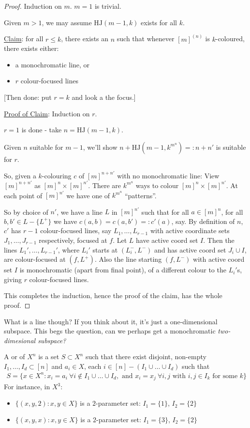 \documentclass[10pt]{article}
\newcommand{\hj}{\textrm{HJ}}
\begin{document}
\begin{proof}
   Induction on $m$. $m = 1$ is trivial.

   Given $m > 1$, we may assume $\hj(m-1,k)$ exists for all $k$.

   \underline{Claim}: for all $r\le k$, there exists an $n$ such that whenever $[m]^{(n)}$ is $k$-coloured, there exists either:
   \begin{itemize}
       \item a monochromatic line, or
       \item $r$ colour-focused lines
   \end{itemize}
   [Then done: put $r = k$ and look a the focus.]

   \underline{Proof of Claim}: Induction on $r$.

   $r = 1$ is done - take $n = \hj(m-1,k)$.

   Given $n$ suitable for $m-1$, we'll show $n + \hj(m-1,k^{m^n}) = : n + n'$ is suitable for $r$.

   So, given a $k$-colouring $c$ of $[m]^{n+n'}$ with no monochromatic line: View $[m]^{n+n'}$ as $[m]^{n}\times [m]^{n'}$. There are $k^{m^n}$ ways to colour $[m]^{n}\times [m]^{n'}$. At each point of $[m]^{n'}$ we have one of $k^{m^n}$ ``patterns''.

   So by choice of $n'$, we have a line $L$ in $[m]^{n'}$ such that for all $a \in [m]^{n}$, for all $b,b' \in L - \{L^+\}$ we have $c(a,b) = c(a,b') =: c'(a)$, say. By definition of $n$, $c'$ has $r-1$ colour-focused lines, say $L_1,\dots,L_{r-1}$ with active coordinate sets $J_1,\dots,J_{r-1}$ respectively, focused at $f$. Let $L$ have active coord set $I$. Then the lines $L_1',\dots,L_{r-1}'$, where $L_i'$ starts at $(L_i^-,L^-)$ and has active coord set $J_i\cup I$, are colour-focused at $(f,L^+)$. Also the line starting $(f,L^-)$ with active coord set $I$ is monochromatic (apart from final point), of a different colour to the $L_i'$s, giving $r$ colour-focused lines.

   This completes the induction, hence the proof of the claim, has the whole proof.
\end{proof}

What is a line though? If you think about it, it's just a one-dimensional subspace. This begs the question, can we perhaps get a monochromatic \it{two}-dimesional subspace?

A  or  of $X^n$ is a set $S \subset X^n$ such that there exist disjoint, non-empty $I_1,\dots,I_d\subset [n]$ and $a_i \in X$, each $i \in [n]-(I_1\cup\dots\cup I_d)$ such that
\begin{align*}
    S = \{x \in X^n : x_i = a_i\ \forall i\not\in I_1\cup\dots\cup I_d,\textrm{ and }x_i = x_j\ \forall i,j\textrm{ with }i,j\in I_k\textrm{ for some }k\}
\end{align*}
For instance, in $X^3$:
\begin{itemize}
    \item $\{(x,y,2):x,y\in X\}$ is a $2$-parameter set: $I_1 = \{1\}$, $I_2 = \{2\}$
    \item $\{(x,y,x):x,y\in X\}$ is a $2$-parameter set: $I_1 = \{3\}$, $I_2 = \{2\}$
\end{itemize}
\end{document}
